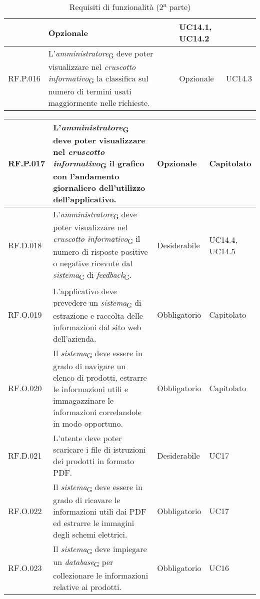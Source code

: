 \begin{table}[H]
\begin{tabular}{|C{2.7cm}|L{7.2cm}|C{2.7cm}|C{2cm}|}
         & Opzionale & UC14.1, UC14.2 \\
        \hline
        RF.P.016 & L'\textit{amministratore}\textsubscript{G} deve poter visualizzare nel \textit{cruscotto informativo}\textsubscript{G} la classifica sul numero di termini usati maggiormente nelle richieste.
         & Opzionale & UC14.3 \\
        \hline
    \end{tabular}
    \caption{Requisiti di funzionalità  (2\textsuperscript{a} parte)}
\end{table}
\begin{table}[H]
\centering
    \begin{tabular}{|C{2.7cm}|L{7.2cm}|C{2.7cm}|C{2cm}|}
        \hline
        RF.P.017 & L'\textit{amministratore}\textsubscript{G} deve poter visualizzare nel \textit{cruscotto informativo}\textsubscript{G} il grafico con l'andamento giornaliero dell’utilizzo dell’applicativo.
         & Opzionale & Capitolato \\
        \hline
        RF.D.018 & L'\textit{amministratore}\textsubscript{G} deve poter visualizzare nel \textit{cruscotto informativo}\textsubscript{G} il numero di risposte positive o negative ricevute dal \textit{sistema}\textsubscript{G} di \textit{feedback}\textsubscript{G}.
         & Desiderabile & UC14.4, UC14.5 \\
        \hline
        RF.O.019 &  L’applicativo deve prevedere un \textit{sistema}\textsubscript{G} di estrazione e raccolta delle informazioni dal sito web dell'azienda.
         & Obbligatorio & Capitolato \\
        \hline
         RF.O.020 & Il \textit{sistema}\textsubscript{G} deve essere in grado di navigare un elenco di prodotti, estrarre le informazioni utili e immagazzinare le informazioni correlandole in modo opportuno.
         & Obbligatorio & Capitolato \\
        \hline
         RF.D.021 & L'utente deve poter scaricare i file di istruzioni dei prodotti in formato PDF.
         & Desiderabile & UC17 \\
        \hline
         RF.O.022 & Il \textit{sistema}\textsubscript{G} deve essere in grado di ricavare le informazioni utili dai PDF ed estrarre le immagini degli schemi elettrici.
         & Obbligatorio & UC17 \\
        \hline
         RF.O.023 & Il \textit{sistema}\textsubscript{G} deve impiegare un \textit{database}\textsubscript{G} per collezionare le informazioni relative ai prodotti.
         & Obbligatorio & UC16 \\

\end{tabular}
\end{table}
